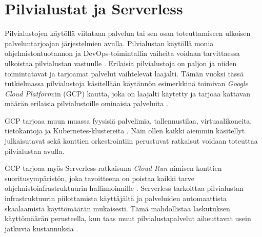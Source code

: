 
\section{Pilvialustat ja Serverless}

Pilvialustojen käytöllä viitataan palvelun tai sen osan toteuttamiseen ulkoisen palveluntarjoajan järjestelmien avulla.
Pilvialustan käytöllä monia ohjelmistontuotannon ja DevOps-toimintallin vaiheita voidaan tarvittaessa ulkoistaa pilvialustan vastuulle \cite{tomarchio20}.
Erilaisia pilvialustoja on paljon ja niiden toimintatavat ja tarjoamat palvelut vaihtelevat laajalti.
Tämän vuoksi tässä tutkielmassa pilvialustoja käsitellään käytännön esimerkkinä toimivan \textit{Google Cloud Platform}:in (GCP) kautta, joka on laajalti käytetty ja tarjoaa kattavan määrän erilaisia pilvialustoille ominaisia palveluita \cite{ahuja20}.

GCP tarjoaa muun muassa fyysisiä palvelimia, tallennustilaa, virtuaalikoneita, tietokantoja ja Kubernetes-klustereita \cite{Products23}.
Näin ollen kaikki aiemmin käsitellyt julkaisutavat sekä konttien orkestrointiin perustuvat ratkaisut voidaan toteuttaa pilvialustan avulla.

GCP tarjoaa myös Serverless-ratkaisuna \textit{Cloud Run} nimisen konttien suoritusympäristön, joka tavoitteena on poistaa kaikki tarve ohjelmistoinfrastruktuurin hallinnoinnille \cite{Products23}.
Serverless tarkoittaa pilvialustan infrastruktuurin piilottamista käyttäjältä ja palveluiden automaattista skaalaamista käyttömäärän mukaisesti.
Tämä mahdollistaa laskutuksen käyttömäärän perusteella, kun taas muut pilvialustapalvelut aiheuttavat usein jatkuvia kustannuksia \cite{shafiei22}.

